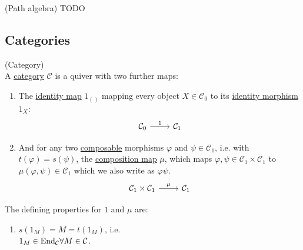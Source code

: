\begin{definition}{(Path algebra)}\label{def:path_algebra}
TODO
\end{definition}

\subsection{Categories}

\begin{definition}{(Category)}\label{def:category}\\
\noindent A \ul{category} $\mathcal{C}$ is a quiver with two further maps:
\begin{enumerate}
\renewcommand{\labelenumi}{(id)}
\item The \ul{identity map} $1_{( )}$ mapping every object $X \in\mathcal{C}_{0}$ to its \ul{identity morphism} $1_{X}$:
\[
\begin{tikzcd}[column sep=small]
\mathcal{C}_{0} \arrow[rr,"1"] &  & \mathcal{C}_{1}
\end{tikzcd}
\]
\renewcommand{\labelenumi}{($\mu$)}
\item And for any two \ul{composable} morphisms $\varphi$ and $\psi \in \mathcal{C}_{1}$, i.e. with $t(\varphi) = s(\psi)$, the
\ul{composition map} $\mu$, which maps $\varphi, \psi \in \mathcal{C}_{1}\times\mathcal{C}_{1}$ to $\mu(\varphi,\psi) \in \mathcal{C}_{1}$ which
we also write as $\varphi\psi$. 
\[
\begin{tikzcd}[column sep=small]
\mathcal{C}_{1} \times \mathcal{C}_{1} \arrow[rr,"\mu"] &  & \mathcal{C}_{1}
\end{tikzcd}
\]
\end{enumerate}
\noindent The defining properties for $1$ and $\mu$ are:
\renewcommand{\labelenumi}{(\theenumi)}
\begin{enumerate}
\item $s(1_{M}) = M = t(1_{M})$, i.e.\\
$1_{M} \in \textup{End}_{\mathcal{C}} \forall M \in \mathcal{C}$.


\end{enumerate}
\end{definition}

